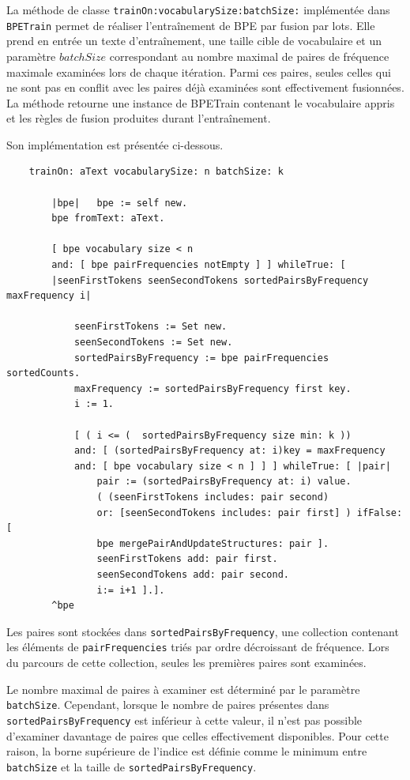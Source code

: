 \documentclass[12pt,a4paper]{report}
\begin{document}
	La méthode de classe \texttt{trainOn:vocabularySize:batchSize:} implémentée dans \texttt{BPETrain} permet de réaliser l’entraînement de BPE par fusion par lots. Elle prend en entrée un texte d’entraînement, une taille cible de vocabulaire et un paramètre $batchSize$ correspondant au nombre maximal de paires de fréquence maximale examinées lors de chaque itération. Parmi ces paires, seules celles qui ne sont pas en conflit avec les paires déjà examinées sont effectivement fusionnées. La méthode retourne une instance de BPETrain contenant le vocabulaire appris et les règles de fusion produites durant l’entraînement.
	
	Son implémentation est présentée ci-dessous.
	
	\begin{verbatim}
	trainOn: aText vocabularySize: n batchSize: k
	
		|bpe|	bpe := self new.
		bpe fromText: aText.
		
		[ bpe vocabulary size < n 
		and: [ bpe pairFrequencies notEmpty ] ] whileTrue: [
		|seenFirstTokens seenSecondTokens sortedPairsByFrequency maxFrequency i|
		
			seenFirstTokens := Set new.
			seenSecondTokens := Set new.
			sortedPairsByFrequency := bpe pairFrequencies sortedCounts.
			maxFrequency := sortedPairsByFrequency first key.
			i := 1.
			
			[ ( i <= (	sortedPairsByFrequency size min: k ))
			and: [ (sortedPairsByFrequency at: i)key = maxFrequency
			and: [ bpe vocabulary size < n ] ] ] whileTrue: [ |pair|
				pair := (sortedPairsByFrequency at: i) value.
				( (seenFirstTokens includes: pair second)
				or: [seenSecondTokens includes: pair first] ) ifFalse: [
				bpe mergePairAndUpdateStructures: pair ].
				seenFirstTokens add: pair first.
				seenSecondTokens add: pair second.
				i:= i+1 ].].
		^bpe 
	\end{verbatim}
	
	Les paires sont stockées dans \texttt{sortedPairsByFrequency}, une collection contenant les éléments de \texttt{pairFrequencies} triés par ordre décroissant de fréquence. Lors du parcours de cette collection, seules les premières paires sont examinées.
	
	Le nombre maximal de paires à examiner est déterminé par le paramètre \texttt{batchSize}. Cependant, lorsque le nombre de paires présentes dans \texttt{sortedPairsByFrequency} est inférieur à cette valeur, il n'est pas possible d'examiner davantage de paires que celles effectivement disponibles. Pour cette raison, la borne supérieure de l'indice est définie comme le minimum entre \texttt{batchSize} et la taille de \texttt{sortedPairsByFrequency}.
	
\end{document}
